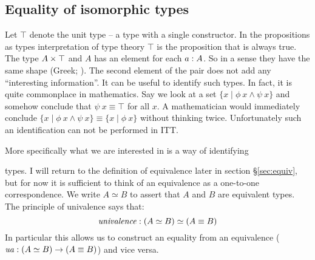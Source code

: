 %
\subsection{Equality of isomorphic types}
%
Let $\top$ denote the unit type -- a type with a single constructor.
In the propositions as types interpretation of type theory $\top$ is
the proposition that is always true. The type $A \times \top$ and $A$ has
an element for each $a \mathrel{:} A$. So in a sense they have the same shape
(Greek;
). The second element of the pair does not
add any ``interesting information''. It can be useful to identify such
types. In fact, it is quite commonplace in mathematics. Say we look at
a set $\{x \mid \phi\ x \land \psi\ x\}$ and somehow conclude that
$\psi\ x \equiv \top$ for all $x$. A mathematician would immediately
conclude $\{x \mid \phi\ x \land \psi\ x\} \equiv \{x \mid \phi\ x\}$
without thinking twice. Unfortunately such an identification can not
be performed in ITT.

More specifically what we are interested in is a way of identifying

 types. I will return to the definition of
equivalence later in section \S\ref{sec:equiv}, but for now it is
sufficient to think of an equivalence as a one-to-one correspondence.
We write $A \simeq B$ to assert that $A$ and $B$ are equivalent types.
The principle of univalence says that:
%
$$\mathit{univalence} \mathrel{:} (A \simeq B) \simeq (A \equiv B)$$
%
In particular this allows us to construct an equality from an equivalence
($\mathit{ua} \mathrel{:} (A \simeq B) \to (A \equiv B)$) and vice versa.

